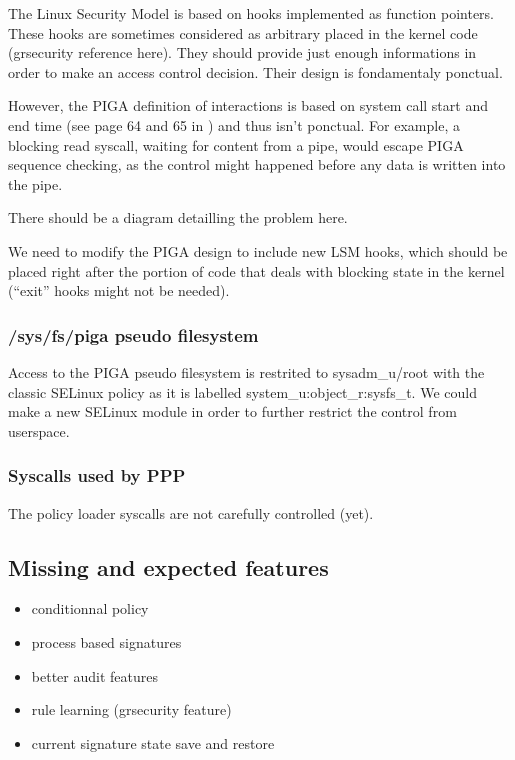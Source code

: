 \documentclass[pdftex,a4paper,titlepage,11pt]{article}
\begin{document}
The Linux Security Model is based on hooks implemented as function pointers. These hooks are sometimes considered as arbitrary placed in the kernel code (grsecurity reference here). They should provide just enough informations in order to make an access control decision. Their design is fondamentaly ponctual.

\bigskip

However, the PIGA definition of interactions is based on system call start and end time (see page 64 and 65 in \cite{THESEBRIFFAUT}) and thus isn't ponctual. For example, a blocking read syscall, waiting for content from a pipe, would escape PIGA sequence checking, as the control might happened before any data is written into the pipe.

\bigskip

There should be a diagram detailling the problem here.

\bigskip

We need to modify the PIGA design to include new LSM hooks, which should be placed right after the portion of code that deals with blocking state in the kernel (``exit'' hooks might not be needed).

\subsubsection{/sys/fs/piga pseudo filesystem}

Access to the PIGA pseudo filesystem is restrited to sysadm\_u/root with the classic SELinux policy as it is labelled system\_u:object\_r:sysfs\_t. We could make a new SELinux module in order to further restrict the control from userspace.

\subsubsection{Syscalls used by PPP}

The policy loader syscalls are not carefully controlled (yet).

\subsection{Missing and expected features}

\begin{itemize}
	\item conditionnal policy
	\item process based signatures
	\item better audit features
	\item rule learning (grsecurity feature)
	\item current signature state save and restore
\end{itemize}
\end{document}
